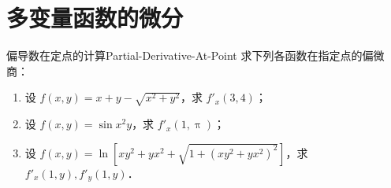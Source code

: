 \section{多变量函数的微分}

\begin{problem}{偏导数在定点的计算}{Partial-Derivative-At-Point}
    求下列各函数在指定点的偏微商：
    \begin{enumerate}
        \item 设 $f(x,y) = x + y - \sqrt{x^2 + y^2}$，求 $f'_x(3,4)$；
        \item 设 $f(x,y) = \sin x^2 y$，求 $f'_x(1, \uppi)$；
        \item 设 $f(x,y) = \ln[xy^2 + yx^2 + \sqrt{1 + (xy^2 + yx^2)^2}]$，求 $f'_x(1, y), f'_y(1, y)$．
    \end{enumerate}
\end{problem}

